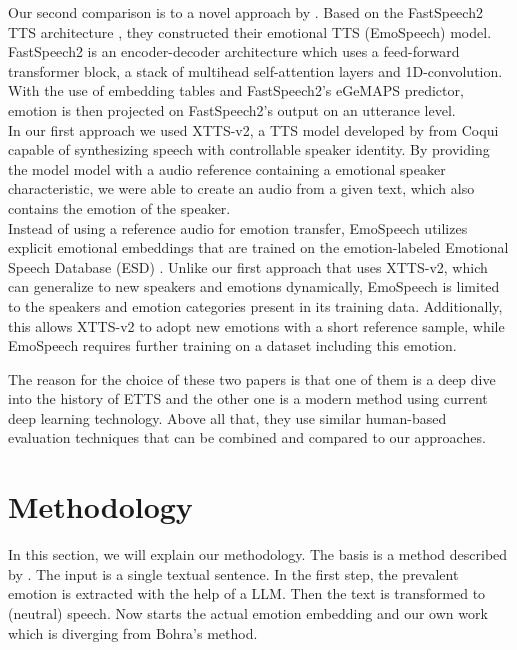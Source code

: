 \documentclass[11pt]{article}
\begin{document}
Our second comparison is to a novel approach by \cite{diatlova_emospeech_2023}. Based on the FastSpeech2 TTS architecture \cite{ren2020fastspeech}, they constructed their emotional TTS (EmoSpeech) model. FastSpeech2 is an encoder-decoder architecture which uses a feed-forward transformer block, a stack of multihead self-attention layers and 1D-convolution. With the use of embedding tables and FastSpeech2's eGeMAPS predictor, emotion is then projected on FastSpeech2's output on an utterance level. \\
In our first approach we used XTTS-v2, a TTS model developed by \cite{casanova2024xtts} from Coqui capable of synthesizing speech with controllable speaker identity. By providing the model model with a audio reference containing a emotional speaker characteristic, we were able to create an audio from a given text, which also contains the emotion of the speaker. \\
Instead of using a reference audio for emotion transfer, EmoSpeech utilizes explicit emotional embeddings that are trained on the emotion-labeled Emotional Speech Database (ESD) \cite{zhou2022emotional}. Unlike our first approach that uses XTTS-v2, which can generalize to new speakers and emotions dynamically, EmoSpeech is limited to the speakers and emotion categories present in its training data. Additionally, this allows XTTS-v2 to adopt new emotions with a short reference sample, while EmoSpeech requires further training on a dataset including this emotion.   
\\


The reason for the choice of these two papers is that one of them is a deep dive into the history of ETTS and the other one is a modern method using current deep learning technology. Above all that, they use similar human-based evaluation techniques that can be combined and compared to our approaches.

\section{Methodology}
\label{methodology}
In this section, we will explain our methodology. The basis is a method described by \cite{bohra_smart_2022}. The input is a single textual sentence. In the first step, the prevalent emotion is extracted with the help of a LLM. Then the text is transformed to (neutral) speech. Now starts the actual emotion embedding and our own work which is diverging from Bohra's method.
\end{document}

